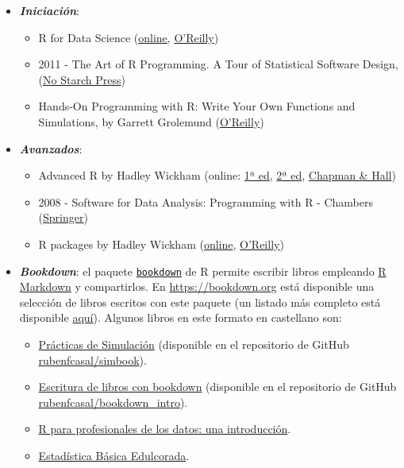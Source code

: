 \documentclass[]{book}
\begin{document}
\begin{itemize}
\item
  \textbf{\emph{Iniciación}}:

  \begin{itemize}
  \item
    R for Data Science
    (\href{http://r4ds.had.co.nz/}{online}, \href{http://shop.oreilly.com/product/0636920034407.do}{O'Reilly})
  \item
    2011 - The Art of R Programming. A Tour of Statistical Software Design,
    (\href{https://www.nostarch.com/artofr.htm}{No Starch Press})
  \item
    Hands-On Programming with R: Write Your Own Functions and Simulations,
    by Garrett Grolemund
    (\href{http://shop.oreilly.com/product/0636920028574.do}{O'Reilly})
  \end{itemize}
\item
  \textbf{\emph{Avanzados}}:

  \begin{itemize}
  \item
    Advanced R by Hadley Wickham
    (online: \href{http://adv-r.had.co.nz/}{1ª ed},
    \href{https://adv-r.hadley.nz/}{2ª ed},
    \href{https://www.amazon.com/dp/1466586966}{Chapman \& Hall})
  \item
    2008 - Software for Data Analysis: Programming with R - Chambers
    (\href{http://www.springer.com/la/book/9780387759357}{Springer})
  \item
    R packages by Hadley Wickham
    (\href{http://r-pkgs.had.co.nz/}{online},
    \href{http://shop.oreilly.com/product/0636920034421.do}{O'Reilly})
  \end{itemize}
\item
  \textbf{\emph{Bookdown}}:
  el paquete \href{https://bookdown.org}{\texttt{bookdown}} de R permite escribir libros empleando
  \href{http://rmarkdown.rstudio.com}{R Markdown} y compartirlos.
  En \url{https://bookdown.org} está disponible una selección de libros escritos con este paquete
  (un listado más completo está disponible \href{https://bookdown.org/home/archive/}{aquí}).
  Algunos libros en este formato en castellano son:

  \begin{itemize}
  \item
    \href{https://rubenfcasal.github.io/simbook}{Prácticas de Simulación}
    (disponible en el repositorio de GitHub
    \href{https://github.com/rubenfcasal/simbook}{rubenfcasal/simbook}).
  \item
    \href{https://rubenfcasal.github.io/bookdown_intro/}{Escritura de libros con bookdown}
    (disponible en el repositorio de GitHub
    \href{https://github.com/rubenfcasal/bookdown_intro}{rubenfcasal/bookdown\_intro}).
  \item
    \href{https://www.datanalytics.com/libro_r/index.html}{R para profesionales de los datos: una introducción}.
  \item
    \href{https://bookdown.org/aquintela/EBE}{Estadística Básica Edulcorada}.
  \end{itemize}
\end{itemize}
\end{document}
